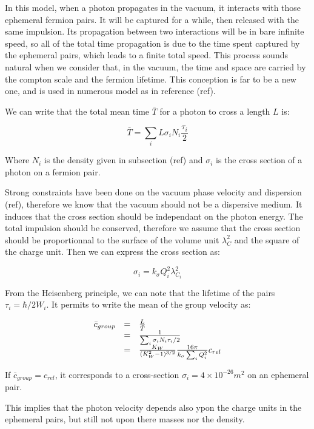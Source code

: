 \documentclass[9pt, a4, twoside]{article}
\begin{document}
In this model, when a photon propagates in the vacuum, it interacts with those ephemeral fermion pairs. It will be captured for a while, then released with the same impulsion. Its propagation between two interactions will be in bare infinite speed, so all of the total time propagation is due to the time spent captured by the ephemeral pairs, which leads to a finite total speed.
This process sounds natural when we consider that, in the vacuum, the time and space are carried by the compton scale and the fermion lifetime. This conception is far to be a new one, and is used in numerous model as in reference (ref).

We can write that the total mean time $\bar T$ for a photon to cross a length $L$ is:

\[\bar T=\sum_i L\sigma_i N_i \frac {\tau_i} {2}\]

Where $N_i$ is the density given in subsection (ref) and $\sigma_i$ is the cross section of a photon on a fermion pair.

Strong constraints have been done on the vacuum phase velocity and dispersion (ref), therefore we know that the vacuum should not be a dispersive medium. It induces that the cross section should be independant on the photon energy. The total impulsion should be conserved, therefore we assume that the cross section should be proportionnal to the surface of the volume unit $\lambda^2_C$ and the square of the charge unit. Then we can express the cross section as:

\[ \sigma_i = k_\sigma Q^2_i \lambda^2_{C_i}\]

From the Heisenberg principle, we can note that the lifetime of the pairs $\tau_i = \hbar/ 2W_i$. It permits to write the mean of the group velocity as:

\[
\begin {array} {r c l}
\bar {c}_{group} & = & \frac {L} {\bar T}\\
                 & = & \frac {1} {\sum_i\sigma_iN_i \tau_i/2}\\
                 & = &  \frac {K_W} { (K^2_W - 1)^{3/2}} \frac {16\pi} {k_\sigma \sum_iQ^2_i} c_{rel}
\end {array}
\]

If $\bar {c}_{group} = c_{rel}$, it corresponds to a cross-section $\sigma_i=4\times 10^{-26}m^2$ on an ephemeral pair.

This implies that the photon velocity depends also ypon the charge units in the ephemeral pairs, but still not upon there masses nor the density.
\end{document}
